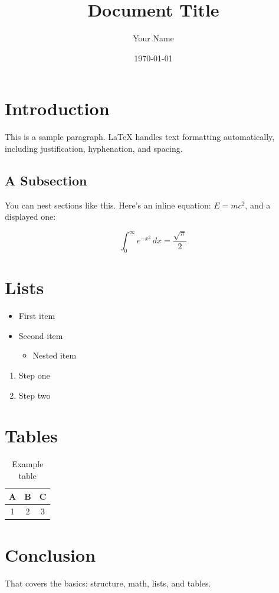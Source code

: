 \documentclass[12pt,a4paper]{article}
\title{Document Title}
\author{Your Name}
\date{\today}
\begin{document}
\maketitle

\section{Introduction}
This is a sample paragraph. LaTeX handles text formatting automatically,
including justification, hyphenation, and spacing.

\subsection{A Subsection}
You can nest sections like this. Here's an inline equation: $E = mc^2$,
and a displayed one:

\begin{equation}
    \int_{0}^{\infty} e^{-x^2} \, dx = \frac{\sqrt{\pi}}{2}
\end{equation}

\section{Lists}
\begin{itemize}
    \item First item
    \item Second item
    \begin{itemize}
        \item Nested item
    \end{itemize}
\end{itemize}

\begin{enumerate}
    \item Step one
    \item Step two
\end{enumerate}

\section{Tables}
\begin{table}[h]
    \centering
    \begin{tabular}{|c|c|c|}
        \hline
        A & B & C \\
        \hline
        1 & 2 & 3 \\
        \hline
    \end{tabular}
    \caption{Example table}
\end{table}

\section{Conclusion}
That covers the basics: structure, math, lists, and tables.
\end{document}
